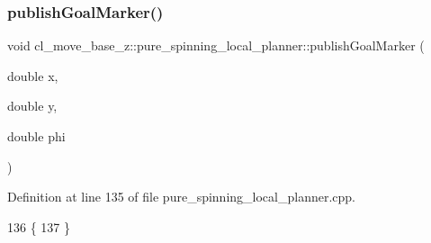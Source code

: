 \subsubsection{\texorpdfstring{publish\+Goal\+Marker()}{publishGoalMarker()}}
{\footnotesize\ttfamily void cl\+\_\+move\+\_\+base\+\_\+z\+::pure\+\_\+spinning\+\_\+local\+\_\+planner\+::publish\+Goal\+Marker (\begin{DoxyParamCaption}\item[{double}]{x,  }\item[{double}]{y,  }\item[{double}]{phi }\end{DoxyParamCaption})}



Definition at line 135 of file pure\+\_\+spinning\+\_\+local\+\_\+planner.\+cpp.


\begin{DoxyCode}
136 \{
137 \}
\end{DoxyCode}
